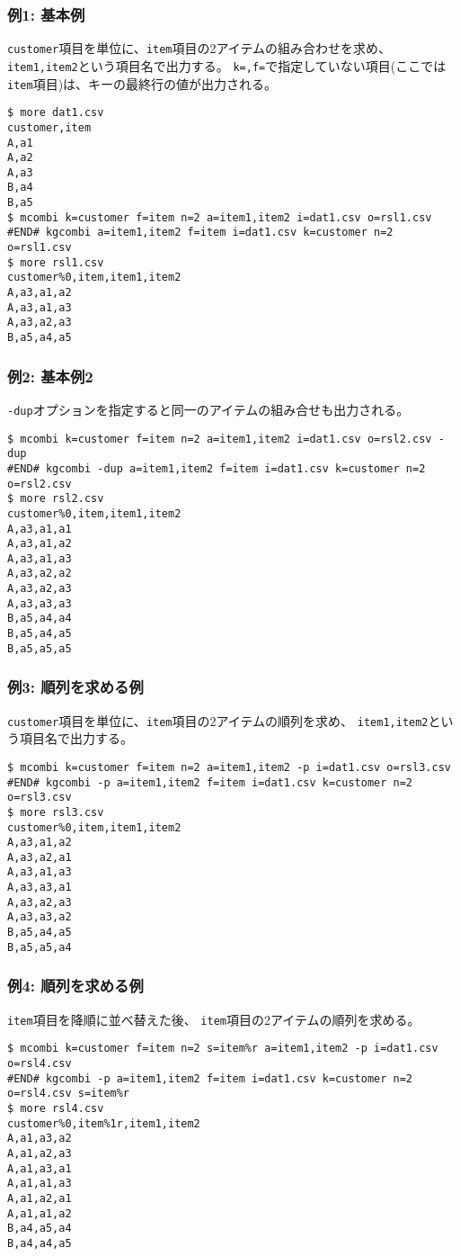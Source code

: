 \subsubsection*{例1: 基本例}

\verb|customer|項目を単位に、\verb|item|項目の2アイテムの組み合わせを求め、
\verb|item1,item2|という項目名で出力する。
\verb|k=,f=|で指定していない項目(ここでは\verb|item|項目)は、キーの最終行の値が出力される。


\begin{Verbatim}[baselinestretch=0.7,frame=single]
$ more dat1.csv
customer,item
A,a1
A,a2
A,a3
B,a4
B,a5
$ mcombi k=customer f=item n=2 a=item1,item2 i=dat1.csv o=rsl1.csv
#END# kgcombi a=item1,item2 f=item i=dat1.csv k=customer n=2 o=rsl1.csv
$ more rsl1.csv
customer%0,item,item1,item2
A,a3,a1,a2
A,a3,a1,a3
A,a3,a2,a3
B,a5,a4,a5
\end{Verbatim}
\subsubsection*{例2: 基本例2}

\verb|-dup|オプションを指定すると同一のアイテムの組み合せも出力される。


\begin{Verbatim}[baselinestretch=0.7,frame=single]
$ mcombi k=customer f=item n=2 a=item1,item2 i=dat1.csv o=rsl2.csv -dup
#END# kgcombi -dup a=item1,item2 f=item i=dat1.csv k=customer n=2 o=rsl2.csv
$ more rsl2.csv
customer%0,item,item1,item2
A,a3,a1,a1
A,a3,a1,a2
A,a3,a1,a3
A,a3,a2,a2
A,a3,a2,a3
A,a3,a3,a3
B,a5,a4,a4
B,a5,a4,a5
B,a5,a5,a5
\end{Verbatim}
\subsubsection*{例3: 順列を求める例}

\verb|customer|項目を単位に、\verb|item|項目の2アイテムの順列を求め、
\verb|item1,item2|という項目名で出力する。


\begin{Verbatim}[baselinestretch=0.7,frame=single]
$ mcombi k=customer f=item n=2 a=item1,item2 -p i=dat1.csv o=rsl3.csv
#END# kgcombi -p a=item1,item2 f=item i=dat1.csv k=customer n=2 o=rsl3.csv
$ more rsl3.csv
customer%0,item,item1,item2
A,a3,a1,a2
A,a3,a2,a1
A,a3,a1,a3
A,a3,a3,a1
A,a3,a2,a3
A,a3,a3,a2
B,a5,a4,a5
B,a5,a5,a4
\end{Verbatim}
\subsubsection*{例4: 順列を求める例}

\verb|item|項目を降順に並べ替えた後、
\verb|item|項目の2アイテムの順列を求める。


\begin{Verbatim}[baselinestretch=0.7,frame=single]
$ mcombi k=customer f=item n=2 s=item%r a=item1,item2 -p i=dat1.csv o=rsl4.csv
#END# kgcombi -p a=item1,item2 f=item i=dat1.csv k=customer n=2 o=rsl4.csv s=item%r
$ more rsl4.csv
customer%0,item%1r,item1,item2
A,a1,a3,a2
A,a1,a2,a3
A,a1,a3,a1
A,a1,a1,a3
A,a1,a2,a1
A,a1,a1,a2
B,a4,a5,a4
B,a4,a4,a5
\end{Verbatim}
